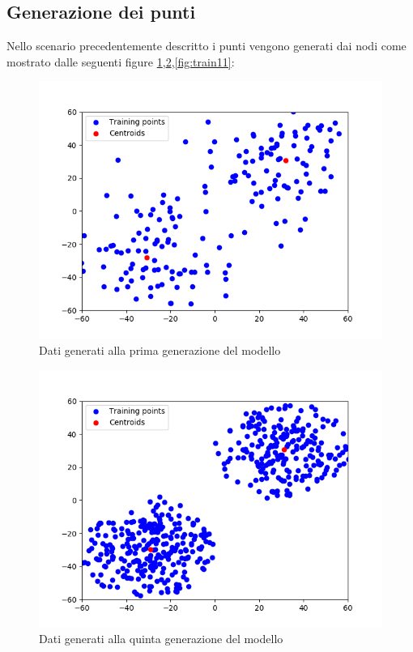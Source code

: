 \subsection{Generazione dei punti}
Nello scenario precedentemente descritto i punti vengono generati dai nodi come mostrato dalle seguenti figure \ref{fig:train1},\ref{fig:train5},\ref{fig:train11}:
\begin{figure}[!htb]
  \centering
  \includegraphics[scale=0.7]{../Immagini/train1.png}
  \caption{Dati generati alla prima generazione del modello}
  \label{fig:train1}
\end{figure}
\begin{figure}[!htb]
  \centering
  \includegraphics[scale=0.7]{../Immagini/train5.png}
  \caption{Dati generati alla quinta generazione del modello}
  \label{fig:train5}
\end{figure}

